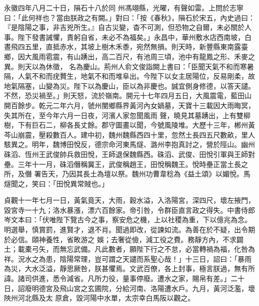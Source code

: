 \begin{pinyinscope}
 永徽四年八月二十日，隕石十八於同
 州馮翊縣，光曜，有聲如雷。上問於志寧曰：「此何祥也？當由朕政之有闕。」對曰：「按《春秋》，隕石於宋五，內史過曰：『是陰陽之事，非吉兇所生。』自古災變，杳不可測，但恐物之自爾，未必關於人事。陛下發書誡懼，責躬自省，未必不為福矣。」永昌中，華州敷水店西南坡，白晝飛四五里，直抵赤水，其坡上樹木禾黍，宛然無損。則天時，新豐縣東南露臺鄉，因大風雨雹震，有山踴出，高二百尺，有池周三頃，池中有龍鳳之形、禾麥之異。則天以為休徵，
 名為慶山。荊州人俞文俊詣闕上書曰：「臣聞天氣不和而寒暑隔，人氣不和而疣贅生，地氣不和而堆阜出。今陛下以女主居陽位，反易剛柔，故地氣隔塞，山變為災。陛下以為慶山，臣以為非慶也。誠宜側身修德，以答天譴。不然，恐災禍至。」則天怒，流於嶺南。開元十七年四月五日，大風震電，藍田山開百餘步。乾元二年六月，虢州閺鄉縣界黃河內女媧墓，天寶十三載因大雨晦冥，失其所在，至今年六月一日夜，河濱人家忽聞風雨
 聲，曉見其墓踴出，上有雙柳樹，下有巨石二，柳各長丈餘。郡守圖畫以聞，今號風陵堆。大歷十三年，郴州黃芩山崩震，壓殺數百人。建中初，魏州魏縣西四十里，忽然土長四五尺數畝，里人駭異之。明年，魏博田悅反，德宗命河東馬燧、潞州李抱真討之，營於陘山。幽州硃滔、恆州王武俊帥兵救田悅，王師退保魏縣西。硃滔、武俊、田悅引軍與王師對壘。三年十一月，硃滔僭稱冀王，武俊稱趙王，田悅稱魏王。悅時壘正當土長之所，及僭
 署告天，乃因其長土為壇以祭。魏州功曹韋稔為《益土頌》以媚悅。馬燧聞之，笑曰：「田悅異常賊也。」



 貞觀十一年七月一日，黃氣竟天，大雨，穀水溢，入洛陽宮，深四尺，壞左掖門，毀宮寺一十九；洛水暴漲，漂六百餘家。帝引咎，令群臣直言政之得失。中書侍郎岑文本曰：「伏唯陛下覽古今之事，察安危之機，上以社稷為重，下以億兆為念。明選舉，慎賞罰，進賢才，退不肖。聞過即改，從諫如流。為善在於不疑，出令期於必信。頤神養性，省畋游之
 娛；去奢從儉，減工役之費。務靜方內，不求闢土；載橐弓矢，而無忘武備。凡此數者，願陛下行之不怠，必當轉禍為福，化咎為祥。況水之為患，陰陽常理，豈可謂之天譴而系聖心哉！」十三日，詔曰：「暴雨為災，大水泛溢，靜思厥咎，朕甚懼焉。文武百僚，各上封事，極言朕過，無有所諱。諸司供進，悉令減省。凡所力役，量事停廢。遭水之家，賜帛有差。」二十日，詔廢明德宮及飛山宮之玄圃院，分給河南、洛陽遭水戶。九月，黃河泛濫，壞陜州河北縣及太
 原倉，毀河陽中水單，太宗幸白馬阪以觀之。




\end{pinyinscope}
